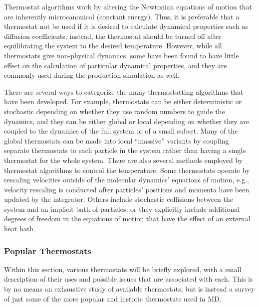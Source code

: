 \documentclass[9pt,bestpractices]{livecoms}
\begin{document}
Thermostat algorithms work by altering the Newtonian equations of motion that are inherently microcanonical (constant energy).
Thus, it is preferable that a thermostat not be used if it is desired to calculate dynamical properties such as diffusion coefficients; instead, the thermostat should be turned off after equilibrating the system to the desired temperature.
However, while all thermostats give non-physical dynamics, some have been found to have little effect on the calculation of particular dynamical properties, and they are commonly used during the production simulation as well\cite{Basconi:2013:JChemTheoryComput}.

There are several ways to categorize the many thermostatting algorithms that have been developed.
For example, thermostats can be either deterministic or stochastic depending on whether they use random numbers to guide the dynamics, and they can be either global or local depending on whether they are coupled to the dynamics of the full system or of a small subset.
Many of the global thermostats can be made into local ``massive'' variants by coupling separate thermostats to each particle in the system rather than having a single thermostat for the whole system.
There are also several methods employed by thermostat algorithms to control the temperature.
Some thermostats operate by rescaling velocities outside of the molecular dynamics' equations of motion, e.g., velocity rescaling is conducted after particles' positions and momenta have been updated by the integrator.
Others include stochastic collisions between the system and an implicit bath of particles, or they explicitly include additional degrees of freedom in the equations of motion that have the effect of an external heat bath.

\subsubsection{Popular Thermostats}
Within this section, various thermostats will be briefly explored, with a small description of their uses and possible issues that are associated with each.
This is by no means an exhaustive study of available thermostats, but is instead a survey of just some of the more popular and historic thermostats used in MD.
\end{document}
